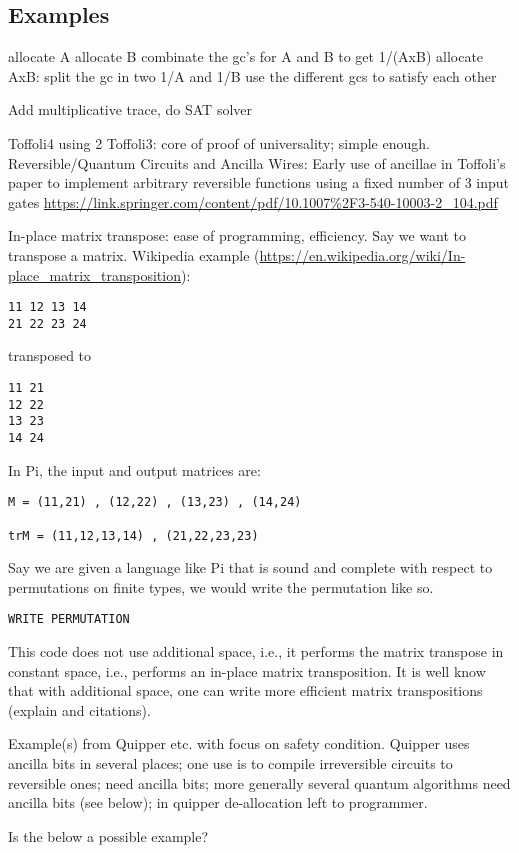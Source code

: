 \documentclass[sigplan,10pt,review,anonymous]{acmart}
\begin{document}
\subsection{Examples}
\label{sec:cat}  

allocate A
allocate B
combinate the gc's for A and B to get 1/(AxB)
allocate AxB: split the gc in two 1/A and 1/B
use the different gcs to satisfy each other

Add multiplicative trace, do SAT solver

Toffoli4 using 2 Toffoli3: core of proof of universality; simple
enough. Reversible/Quantum Circuits and Ancilla Wires: Early use of
ancillae in Toffoli's paper to implement arbitrary reversible
functions using a fixed number of 3 input gates
\url{https://link.springer.com/content/pdf/10.1007%2F3-540-10003-2_104.pdf}

In-place matrix transpose: ease of programming, efficiency. Say we
want to transpose a matrix. Wikipedia example
(\url{https://en.wikipedia.org/wiki/In-place_matrix_transposition}):
\begin{verbatim}
11 12 13 14 
21 22 23 24 
\end{verbatim}
transposed to
\begin{verbatim}
11 21
12 22
13 23
14 24
\end{verbatim}
In Pi, the input and output matrices are:
\begin{verbatim}
M = (11,21) , (12,22) , (13,23) , (14,24) 

trM = (11,12,13,14) , (21,22,23,23) 
\end{verbatim}
Say we are given a language like Pi that is sound and complete with
respect to permutations on finite types, we would write the
permutation like so.
\begin{verbatim}
WRITE PERMUTATION
\end{verbatim}
This code does not use additional space, i.e., it performs the matrix
transpose in constant space, i.e., performs an in-place matrix
transposition. It is well know that with additional space, one can
write more efficient matrix transpositions (explain and citations).

Example(s) from Quipper etc. with focus on safety condition. Quipper
uses ancilla bits in several places; one use is to compile
irreversible circuits to reversible ones; need ancilla bits; more
generally several quantum algorithms need ancilla bits (see below); in
quipper de-allocation left to programmer.

Is the below a possible example?
\end{document}
